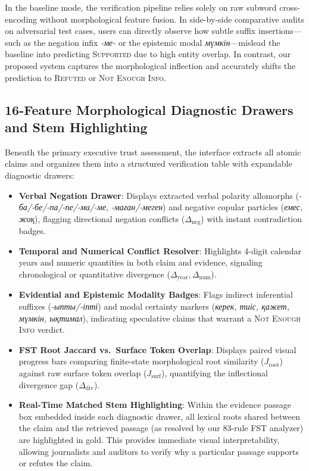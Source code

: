 In the baseline mode, the verification pipeline relies solely on raw subword cross-encoding without morphological feature fusion. In side-by-side comparative audits on adversarial test cases, users can directly observe how subtle suffix insertions---such as the negation infix \textit{-ме-} or the epistemic modal \textit{мүмкін}---mislead the baseline into predicting \textsc{Supported} due to high entity overlap. In contrast, our proposed system captures the morphological inflection and accurately shifts the prediction to \textsc{Refuted} or \textsc{Not Enough Info}.

\subsection{16-Feature Morphological Diagnostic Drawers and Stem Highlighting}
Beneath the primary executive trust assessment, the interface extracts all atomic claims and organizes them into a structured verification table with expandable diagnostic drawers:
\begin{itemize}
    \item \textbf{Verbal Negation Drawer}: Displays extracted verbal polarity allomorphs (\textit{-ба/-бе/-па/-пе/-ма/-ме}, \textit{-маған/-меген}) and negative copular particles (\textit{емес, жоқ}), flagging directional negation conflicts ($\Delta_{\text{neg}}$) with instant contradiction badges.
    \item \textbf{Temporal and Numerical Conflict Resolver}: Highlights 4-digit calendar years and numeric quantities in both claim and evidence, signaling chronological or quantitative divergence ($\Delta_{\text{year}}, \Delta_{\text{num}}$).
    \item \textbf{Evidential and Epistemic Modality Badges}: Flags indirect inferential suffixes (\textit{-ыпты/-іпті}) and modal certainty markers (\textit{керек, тиіс, қажет, мүмкін, ықтимал}), indicating speculative claims that warrant a \textsc{Not Enough Info} verdict.
    \item \textbf{FST Root Jaccard vs.\ Surface Token Overlap}: Displays paired visual progress bars comparing finite-state morphological root similarity ($J_{\text{root}}$) against raw surface token overlap ($J_{\text{surf}}$), quantifying the inflectional divergence gap ($\Delta_{\text{div}}$).
    \item \textbf{Real-Time Matched Stem Highlighting}: Within the evidence passage box embedded inside each diagnostic drawer, all lexical roots shared between the claim and the retrieved passage (as resolved by our 83-rule FST analyzer) are highlighted in gold. This provides immediate visual interpretability, allowing journalists and auditors to verify why a particular passage supports or refutes the claim.
\end{itemize}

